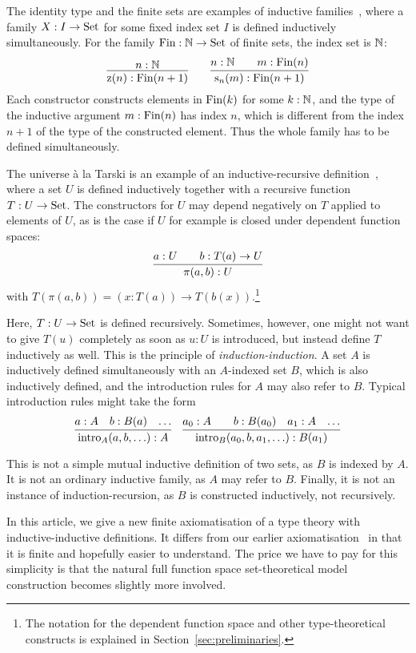 \documentclass{article}
\begin{document}
The identity type and the finite sets are examples
of inductive families~\cite{dybjer1994indfam}, where a family $X : I
\to \text{Set}$ for some fixed index set $I$ is defined inductively
simultaneously. For the family $\text{Fin} : \mathbb{N} \to \text{Set}$ of finite sets,
the index set is $\mathbb{N}$:
\[
\infer{\finzero{n} : \Fin(n + 1)}{n : \Nat} \qquad
\infer{\finsucc{n}{m} : \Fin(n + 1)}{n : \Nat & \quad m : \Fin(n)}
\]
Each constructor constructs elements in $\text{Fin}(k)$ for some $k : \mathbb{N}$,
and the type of the inductive argument $m : \text{Fin}(n)$ has index $n$,
which is different from the index $n + 1$ of the type of the
constructed element. Thus the whole family has to be defined
simultaneously.

The universe \`a la Tarski is an example of an inductive-recursive
definition~\cite{dybjer2000IR}, where a set $U$ is defined inductively
together with a recursive function $T : U \to \text{Set}$.  The constructors
for $U$ may depend negatively on $T$ applied to elements of $U$, as is
the case if $U$ for example is closed under dependent function spaces:
\[
\infer{\pi(a, b) : U}{a : U & \quad b : T(a) \to U}
\]
with $T(\pi(a, b)) = (x : T(a)) \to T(b(x))$.\footnote{The notation
  for the dependent function space and other type-theoretical
  constructs is explained in Section~\ref{sec:preliminaries}.}

Here, $T : U \to \text{Set}$ is defined recursively. Sometimes, however, one
might not want to give $T(u)$ completely as soon as $u : U$ is
introduced, but instead define $T$ inductively as well. This is the
principle of \emph{induction-induction}. A set $A$ is inductively
defined simultaneously with an $A$-indexed set $B$, which is also
inductively defined, and the introduction rules for $A$ may also refer
to $B$. Typical introduction rules might take the form
\[ \infer{\text{intro}_A(a, b, \ldots) : A}{a : A &b : B(a) & \ldots} \quad
\infer{\text{intro}_B(a_0, b, a_1, \ldots) : B(a_1)}{a_0 : A &
&b : B(a_0) & a_1 : A & \ldots} \]

This is not a simple mutual inductive definition of two sets, as $B$
is indexed by $A$. It is not an ordinary inductive family, as $A$ may
refer to $B$. Finally, it is not an instance of induction-recursion,
as $B$ is constructed inductively, not recursively.

In this article, we give a new finite axiomatisation of a type theory
with inductive-inductive definitions. It differs from our earlier
axiomatisation~\cite{nordvallforsbergSetzer2010indind} in that it is
finite and hopefully easier to understand. The price we have to pay
for this simplicity is that the natural full function space
set-theoretical model construction becomes slightly more involved.
\end{document}
